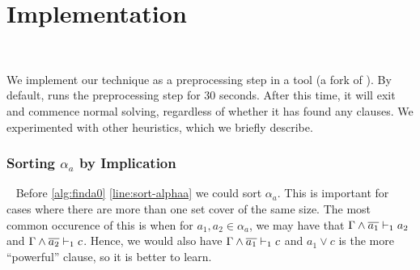 \section{Implementation}~\label{sec:implementation}

We implement our technique as a preprocessing step in a tool \tool (a fork of \cadical
). By default, \tool runs the preprocessing step for
30 seconds. After this time, it will exit and commence normal solving,
regardless of whether it has found any \pr clauses. 
 We experimented with other heuristics, which we briefly describe.





\subsubsection{Sorting $\alpha_a$ by Implication}~\label{subsubsec:impordering}
Before \autoref{alg:finda0} \autoref{line:sort-alphaa} we could sort $\alpha_a$.
This is important for cases where there are more than one set cover of the same
size. The most common occurence of this is when for $a_1, a_2 \in \alpha_a$, we
may have that $\Gamma \land \overline{a_1} \vdash_1 a_2$ and
$\Gamma \land \overline{a_2} \vdash_1 c$. Hence, we would also have $\Gamma \land \overline{a_1} \vdash_1 c$
and $a_1 \lor c$ is the more ``powerful'' clause, so it is better to learn.

